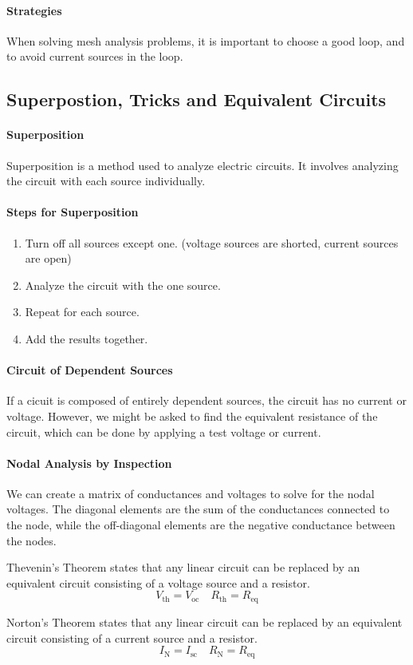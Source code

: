 \documentclass[11pt]{article}
\begin{document}
\paragraph{Strategies} When solving mesh analysis problems, it is important to choose a good loop, and to avoid current sources in the loop.
\subsection{Superpostion, Tricks and Equivalent Circuits}
\paragraph{Superposition} Superposition is a method used to analyze electric circuits. It involves analyzing the circuit with each source individually.
\paragraph{Steps for Superposition}
\begin{enumerate}
    \item Turn off all sources except one. (voltage sources are shorted, current sources are open)
    \item Analyze the circuit with the one source.
    \item Repeat for each source.
    \item Add the results together.
\end{enumerate}
\paragraph{Circuit of Dependent Sources} If a cicuit is composed of entirely dependent sources, the circuit has no current or voltage. However, we might be asked to find the equivalent resistance of the circuit, which can be done by applying a test voltage or current. 
\paragraph{Nodal Analysis by Inspection} We can create a matrix of conductances and voltages to solve for the nodal voltages. The diagonal elements are the sum of the conductances connected to the node, while the off-diagonal elements are the negative conductance between the nodes.
\begin{theorem}
    Thevenin's Theorem states that any linear circuit can be replaced by an equivalent circuit consisting of a voltage source and a resistor.
    \begin{equation}
        V_{\text{th}} = V_{\text{oc}} \quad R_{\text{th}} = R_{\text{eq}}
    \end{equation}
\end{theorem}
\begin{theorem}
    Norton's Theorem states that any linear circuit can be replaced by an equivalent circuit consisting of a current source and a resistor.
    \begin{equation}
        I_{\text{N}} = I_{\text{sc}} \quad R_{\text{N}} = R_{\text{eq}}
    \end{equation}
\end{theorem} 
\end{document}
